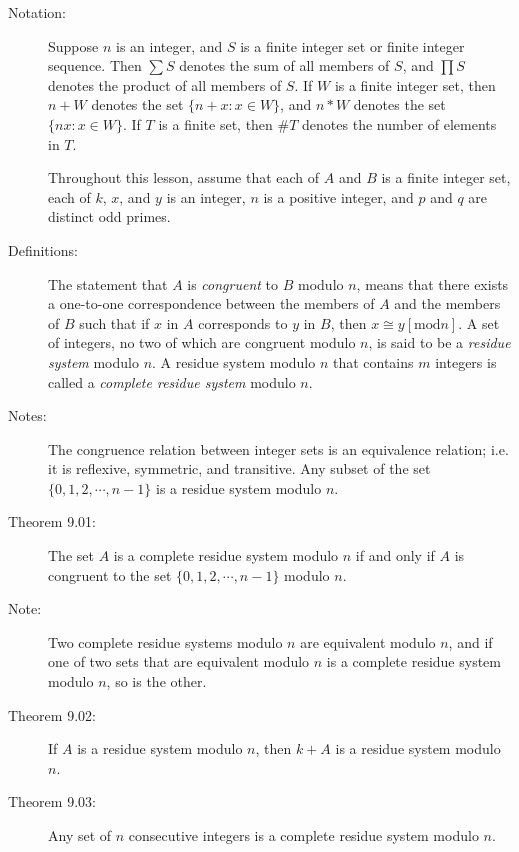 \documentclass{article}
\begin{document}
\begin{description}

  \item[Notation:] Suppose $n$ is an integer, and $S$ is a finite integer set or finite integer sequence. Then $\sum S$ denotes the sum of all members of $S$, and $\prod S$ denotes the product of all members of $S$. If $W$ is a finite integer set, then $n+W$ denotes the set $\{ n+x : x \in W \}$, and $n*W$ denotes the set $\{ nx: x \in W \}$. If $T$ is a finite set, then $\#T$ denotes the number of elements in $T$.

  \item[] Throughout this lesson, assume that each of $A$ and $B$ is a finite integer set, each of $k$, $x$, and $y$ is an integer, $n$ is a positive integer, and $p$ and $q$ are distinct odd primes.

  \item[Definitions:] The statement that $A$ is \emph{congruent} to $B$ modulo $n$, means that there exists a one-to-one correspondence between the members of $A$ and the members of $B$ such that if $x$ in $A$ corresponds to $y$ in $B$, then $x \cong y [\text{mod} n]$. A set of integers, no two of which are congruent modulo $n$, is said to be a \emph{residue system} modulo $n$. A residue system modulo $n$ that contains $m$ integers is called a \emph{complete residue system} modulo $n$.

  \item[Notes:] The congruence relation between integer sets is an equivalence relation; i.e. it is reflexive, symmetric, and transitive. Any subset of the set $\{ 0, 1, 2, \cdots , n-1 \}$ is a residue system modulo $n$.

  \item[Theorem 9.01:] The set $A$ is a complete residue system modulo $n$ if and only if $A$ is congruent to the set $\{ 0, 1, 2, \cdots, n-1 \}$ modulo $n$.

  \item[Note:] Two complete residue systems modulo $n$ are equivalent modulo $n$, and if one of two sets that are equivalent modulo $n$ is a complete residue system modulo $n$, so is the other.

  \item[Theorem 9.02:] If $A$ is a residue system modulo $n$, then $k+A$ is a residue system modulo $n$.

  \item[Theorem 9.03:] Any set of $n$ consecutive integers is a complete residue system modulo $n$.


\end{description}
\end{document}
